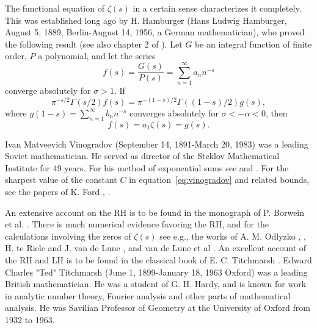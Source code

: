 \documentclass[11pt]{article}
\begin{document}
The functional equation of $\zeta(s)$ in a certain sense characterizes it completely. This was established long ago by H. Hamburger \cite{Ham} (Hans Ludwig Hamburger, August 5, 1889, Berlin-August 14, 1956, a German mathematician), who proved the following result (see also chapter 2 of \cite{Cha}). Let $G$ be an integral function of finite order, $P$ a polynomial, and let the series
\begin{equation}\label{eq:hamburger_f}
f(s) = \frac{G(s)}{P(s)} = \sum_{n=1}^{\infty} a_n n^{-s}
\end{equation}
converge absolutely for $\sigma > 1$. If
\begin{equation}\label{eq:hamburger_functional}
\pi^{-s/2}\Gamma(s/2)f(s) = \pi^{-(1-s)/2}\Gamma((1-s)/2)g(s),
\end{equation}
where $g(1-s) = \sum_{n=1}^{\infty} b_n n^{-s}$ converges absolutely for $\sigma < -\alpha < 0$, then
\begin{equation}\label{eq:hamburger_result}
f(s) = a_1\zeta(s) = g(s).
\end{equation}

Ivan Matveevich Vinogradov (September 14, 1891-March 20, 1983) was a leading Soviet mathematician. He served as director of the Steklov Mathematical Institute for 49 years. For his method of exponential sums see \cite{Vin1} and \cite{Vin2}. For the sharpest value of the constant $C$ in equation~\eqref{eq:vinogradov} and related bounds, see the papers of K. Ford \cite{For1}, \cite{For2}.

An extensive account on the RH is to be found in the monograph of P. Borwein et al. \cite{BCRW}. There is much numerical evidence favoring the RH, and for the calculations involving the zeros of $\zeta(s)$ see e.g., the works of A. M. Odlyzko \cite{Odl1}, \cite{Odl2}, H. te Riele and J. van de Lune \cite{RiLu}, and van de Lune et al \cite{LRW}. An excellent account of the RH and LH is to be found in the classical book of E. C. Titchmarsh \cite{Tit3}. Edward Charles "Ted" Titchmarsh (June 1, 1899-January 18, 1963 Oxford) was a leading British mathematician. He was a student of G. H. Hardy, and is known for work in analytic number theory, Fourier analysis and other parts of mathematical analysis. He was Savilian Professor of Geometry at the University of Oxford from 1932 to 1963.
\end{document}
